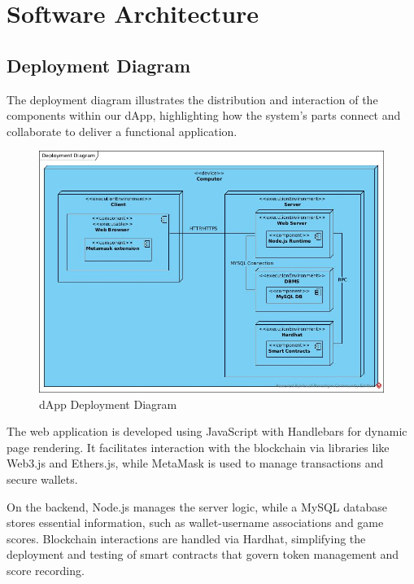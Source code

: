 \documentclass[../main.tex]{subfiles}
\begin{document}
\sloppy %


\section{Software Architecture}\label{sec:software_architecture}


\subsection{Deployment Diagram}
The deployment diagram illustrates the distribution and interaction of the components within our dApp, highlighting how the system's parts connect and collaborate to deliver a functional application.

\begin{figure}[htbp]
    \centering
    \includegraphics[width=\linewidth]{../src/diagrams/Deployment Diagram.jpg}
    \caption{dApp Deployment Diagram}
    \label{fig:deployDiag}
\end{figure}

The web application is developed using JavaScript with Handlebars for dynamic page rendering. It facilitates interaction with the blockchain via libraries like Web3.js and Ethers.js, while MetaMask is used to manage transactions and secure wallets.

On the backend, Node.js manages the server logic, while a MySQL database stores essential information, such as wallet-username associations and game scores. Blockchain interactions are handled via Hardhat, simplifying the deployment and testing of smart contracts that govern token management and score recording.
\end{document}
